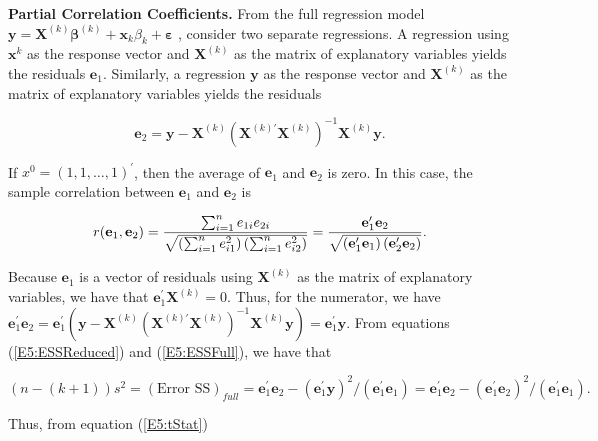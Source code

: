 \textbf{Partial Correlation Coefficients.} From the full regression model $%
\mathbf{y}=\mathbf{X}^{(k)}\boldsymbol \beta^{(k)}+\mathbf{x}_{k}\beta_{k}+\boldsymbol \varepsilon$%
, consider two separate regressions. A regression using
$\mathbf{x}^{k}$ as the response vector and $\mathbf{X}^{(k)}$ as
the matrix of explanatory variables yields the residuals
$\mathbf{e}_1$. Similarly, a regression $\mathbf{y}$ as the response vector and $%
\mathbf{X}^{(k)}$ as the matrix of explanatory variables yields the
residuals
\begin{center}
\[
\mathbf{e}_2=\mathbf{y}-\mathbf{X}^{(k)}\left( \mathbf{X}^{(k)\prime
}\mathbf{X}^{(k)}\right) ^{-1}\mathbf{X}^{(k)}\mathbf{y.}
\]
\end{center}
If $x^{0}=(1,1,\ldots,1)^{\prime}$, then the average of $%
\mathbf{e}_1$ and $\mathbf{e}_2$ is zero. In this case, the sample
correlation between $\mathbf{e}_1$ and $\mathbf{e}_2$ is
\begin{center}
\[
r(\mathbf{e}_1,\mathbf{e}_2)=\frac{\sum_{i=1}^{n}e_{1i}%
e_{2i}}{\sqrt{\left( \sum_{i=1}^{n}e_{i1}^2\right) \left(
\sum_{i=1}^{n}e_{i2}^2\right) }}=\frac{\mathbf{e}_1^{\prime}%
\mathbf{e}_2}{\sqrt{\left( \mathbf{e}_1^{\prime}\mathbf{%
e}_1\right) \left( \mathbf{e}_2^{\prime}\mathbf{e}%
_2\right) }}.
\]%
\end{center}
Because $\mathbf{e}_1$ is a vector of residuals using $\mathbf{X}%
^{(k)}$ as the matrix of explanatory variables, we have that
$\mathbf{e}_1^{\prime}\mathbf{X}^{(k)}=0$. Thus, for the numerator,
we have
\newline $\mathbf{e}_1^{\prime}\mathbf{e}_2=%
\mathbf{e}_1^{\prime}\left( \mathbf{y}-\mathbf{X}^{(k)}\left(
\mathbf{X}^{(k)\prime }\mathbf{X}^{(k)}\right) ^{-1}\mathbf{X}^{(k)}\mathbf{y%
}\right) =\mathbf{e}_1^{\prime}\mathbf{y.}$ From equations
(\ref{E5:ESSReduced}) and (\ref{E5:ESSFull}), we have that
\begin{center}
\[
(n-(k+1))s^2=(\text{Error SS})_{full}=\mathbf{e}_1^{\prime}%
\mathbf{e}_2-\left( \mathbf{e}_1^{\prime}\mathbf{y}\right)
^2/\left( \mathbf{e}_1^{\prime}\mathbf{e}_1\right) =%
\mathbf{e}_1^{\prime}\mathbf{e}_2-\left( \mathbf{e}%
_1^{\prime}\mathbf{e}_2\right) ^2/\left( \mathbf{e}%
_1^{\prime}\mathbf{e}_1\right).
\]
\end{center}
Thus, from equation (\ref{E5:tStat})
